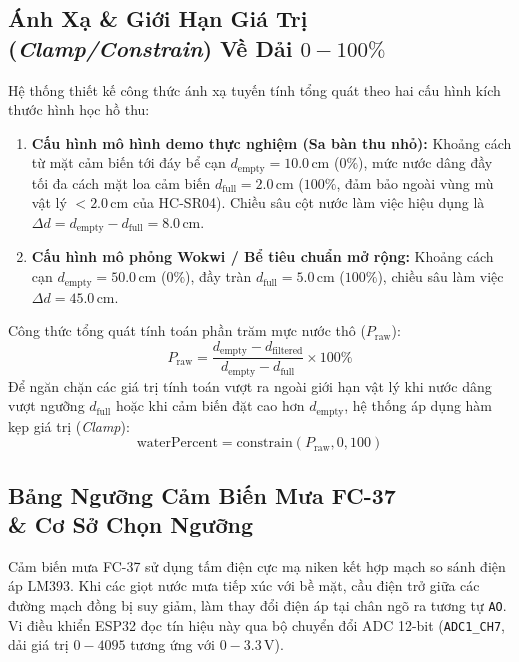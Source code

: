 \subsection{Ánh Xạ \& Giới Hạn Giá Trị (\textit{Clamp/Constrain}) Về Dải $0 - 100\%$}
Hệ thống thiết kế công thức ánh xạ tuyến tính tổng quát theo hai cấu hình kích thước hình học hồ thu:
\begin{enumerate}
    \item \textbf{Cấu hình mô hình demo thực nghiệm (Sa bàn thu nhỏ):} Khoảng cách từ mặt cảm biến tới đáy bể cạn $d_{\text{empty}} = 10.0\,\text{cm}$ ($0\%$), mức nước dâng đầy tối đa cách mặt loa cảm biến $d_{\text{full}} = 2.0\,\text{cm}$ ($100\%$, đảm bảo ngoài vùng mù vật lý $< 2.0\,\text{cm}$ của HC-SR04). Chiều sâu cột nước làm việc hiệu dụng là $\Delta d = d_{\text{empty}} - d_{\text{full}} = 8.0\,\text{cm}$.
    \item \textbf{Cấu hình mô phỏng Wokwi / Bể tiêu chuẩn mở rộng:} Khoảng cách cạn $d_{\text{empty}} = 50.0\,\text{cm}$ ($0\%$), đầy tràn $d_{\text{full}} = 5.0\,\text{cm}$ ($100\%$), chiều sâu làm việc $\Delta d = 45.0\,\text{cm}$.
\end{enumerate}
Công thức tổng quát tính toán phần trăm mực nước thô ($P_{\text{raw}}$):
\begin{equation}
P_{\text{raw}} = \frac{d_{\text{empty}} - d_{\text{filtered}}}{d_{\text{empty}} - d_{\text{full}}} \times 100\%
\end{equation}
Để ngăn chặn các giá trị tính toán vượt ra ngoài giới hạn vật lý khi nước dâng vượt ngưỡng $d_{\text{full}}$ hoặc khi cảm biến đặt cao hơn $d_{\text{empty}}$, hệ thống áp dụng hàm kẹp giá trị (\textit{Clamp}):
\begin{equation}
\text{waterPercent} = \text{constrain}(P_{\text{raw}}, 0, 100)
\end{equation}

\subsection[Bảng Ngưỡng Cảm Biến Mưa FC-37 \& Cơ Sở Chọn Ngưỡng]{Bảng Ngưỡng Cảm Biến Mưa FC-37\\ \& Cơ Sở Chọn Ngưỡng}
Cảm biến mưa FC-37 sử dụng tấm điện cực mạ niken kết hợp mạch so sánh điện áp LM393. Khi các giọt nước mưa tiếp xúc với bề mặt, cầu điện trở giữa các đường mạch đồng bị suy giảm, làm thay đổi điện áp tại chân ngõ ra tương tự \texttt{AO}. Vi điều khiển ESP32 đọc tín hiệu này qua bộ chuyển đổi ADC 12-bit (\texttt{ADC1\_CH7}, dải giá trị $0 - 4095$ tương ứng với $0 - 3.3\,\text{V}$). 

